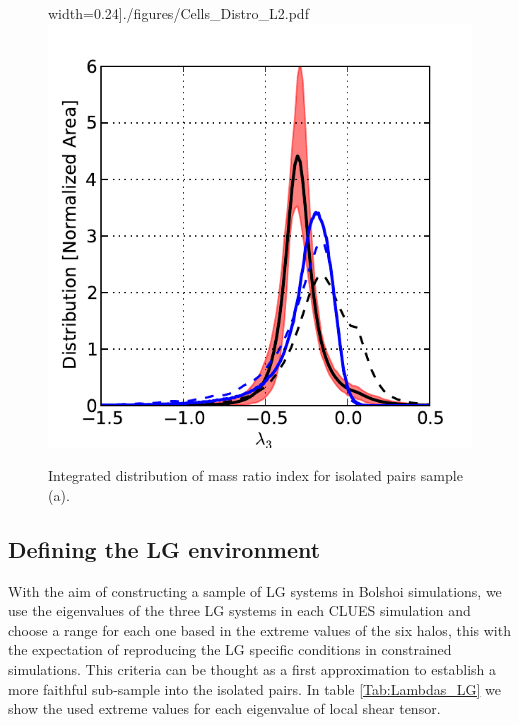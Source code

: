 \documentclass[usenatbib]{latex/mn2e}
\begin{document}
\begin{figure}
\begin{center}
width=0.24\textheight]{./figures/Cells_Distro_L2.pdf}
\includegraphics[trim = 0mm 0mm 5mm 8mm, clip, keepaspectratio=true,
width=0.24\textheight]{./figures/Cells_Distro_L3.pdf}

\caption{\small Integrated distribution of mass ratio index for isolated 
pairs sample (a).}

\label{fig:lambda_histogram}

\vspace{0.1 cm}
\end{center}
\end{figure}


\subsection{Defining the LG environment}
\label{subsec:LG_construction}


With the aim of constructing a sample of LG systems in Bolshoi simulations, 
we use the eigenvalues of the three LG systems in each CLUES simulation 
and choose a range for each one based in the extreme values of the six 
halos, this with the expectation of reproducing the LG specific conditions 
in constrained simulations. This criteria can be thought as a first 
approximation to establish a more faithful sub-sample into the isolated 
pairs. In table \ref{Tab:Lambdas_LG} we show the used extreme values for 
each eigenvalue of local shear tensor.
\end{document}

